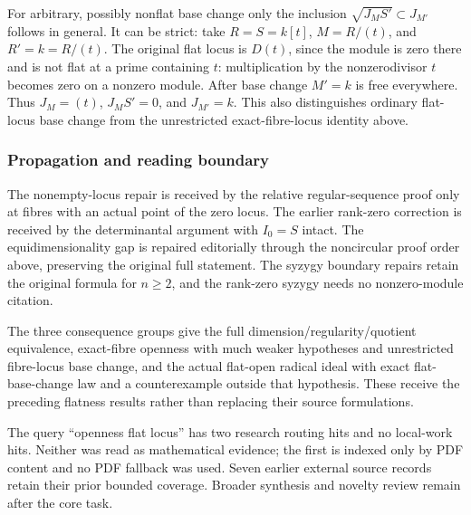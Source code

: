 For arbitrary, possibly nonflat base change only the inclusion \(\sqrt{J_M S'}\subset J_{M'}\) follows in general. It can be strict: take \(R=S=k[t]\), \(M=R/(t)\), and \(R'=k=R/(t)\). The original flat locus is \(D(t)\), since the module is zero there and is not flat at a prime containing \(t\): multiplication by the nonzerodivisor \(t\) becomes zero on a nonzero module. After base change \(M'=k\) is free everywhere. Thus \(J_M=(t)\), \(J_MS'=0\), and \(J_{M'}=k\). This also distinguishes ordinary flat-locus base change from the unrestricted exact-fibre-locus identity above.

\subsubsection{Propagation and reading boundary}\label{algebra-proof-039-propagation-and-reading-boundary}

The nonempty-locus repair is received by the relative regular-sequence proof only at fibres with an actual point of the zero locus. The earlier rank-zero correction is received by the determinantal argument with \(I_0=S\) intact. The equidimensionality gap is repaired editorially through the noncircular proof order above, preserving the original full statement. The syzygy boundary repairs retain the original formula for \(n\geq2\), and the rank-zero syzygy needs no nonzero-module citation.

The three consequence groups give the full dimension/regularity/quotient equivalence, exact-fibre openness with much weaker hypotheses and unrestricted fibre-locus base change, and the actual flat-open radical ideal with exact flat-base-change law and a counterexample outside that hypothesis. These receive the preceding flatness results rather than replacing their source formulations.

The query ``openness flat locus'' has two research routing hits and no local-work hits. Neither was read as mathematical evidence; the first is indexed only by PDF content and no PDF fallback was used. Seven earlier external source records retain their prior bounded coverage. Broader synthesis and novelty review remain after the core task.
